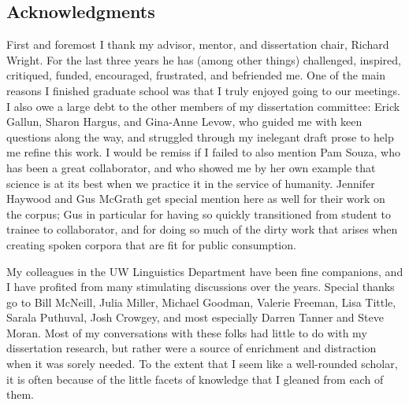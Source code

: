 \begin{spacing}{2}
\tableofcontents
\newpage

\listoffigures
\newpage

\listoftables
\newpage

\chapter*{Acknowledgments}
First and foremost I thank my advisor, mentor, and dissertation chair, Richard Wright.  For the last three years he has (among other things) challenged, inspired, critiqued, funded, encouraged, frustrated, and befriended me.  One of the main reasons I finished graduate school was that I truly enjoyed going to our meetings.  I also owe a large debt to the other members of my dissertation committee: Erick Gallun, Sharon Hargus, and Gina-Anne Levow, who guided me with keen questions along the way, and struggled through my inelegant draft prose to help me refine this work.  I would be remiss if I failed to also mention Pam Souza, who has been a great collaborator, and who showed me by her own example that science is at its best when we practice it in the service of humanity.  Jennifer Haywood and Gus McGrath get special mention here as well for their work on the corpus; Gus in particular for having so quickly transitioned from student to trainee to collaborator, and for doing so much of the dirty work that arises when creating spoken corpora that are fit for public consumption.

My colleagues in the UW Linguistics Department have been fine companions, and I have profited from many stimulating discussions over the years.  Special thanks go to Bill McNeill, Julia Miller, Michael Goodman, Valerie Freeman, Lisa Tittle, Sarala Puthuval, Josh Crowgey, and most especially Darren Tanner and Steve Moran.  Most of my conversations with these folks had little to do with my dissertation research, but rather were a source of enrichment and distraction when it was sorely needed.  To the extent that I seem like a well-rounded scholar, it is often because of the little facets of knowledge that I gleaned from each of them.  


\end{spacing}
